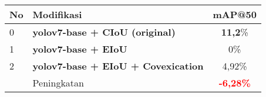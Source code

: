 \begin{table}[H]
  \centering
  \label{tbl:loss_function_perf}
  \vspace{-1ex}
  \begin{tabular}{ l l c }
    \toprule[1.5pt]
    No & Modifikasi        &mAP@50 \\
    \midrule
    0  & \textbf{yolov7-base + CIoU (original)}     & \textbf{11,2}\%\\
    1  & \textbf{yolov7-base + EIoU}                & 0\%\\
    2  & \textbf{yolov7-base + EIoU + Covexication} & 4,92\%\\
    \midrule
       & Peningkatan                                & \textbf{\textcolor{red}{-6,28\%}}\\
    \bottomrule[1.5pt]
  \end{tabular}
\end{table}